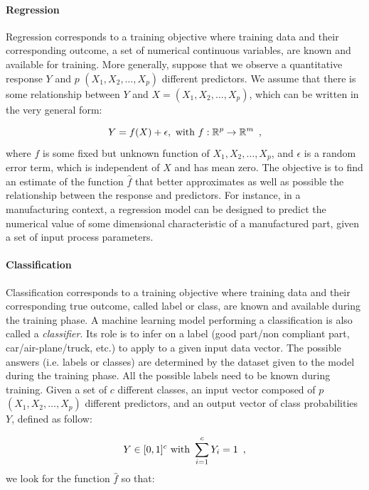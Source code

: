 \paragraph{Regression} \label{Regression}

Regression corresponds to a training objective where training data and their corresponding outcome, a set of numerical continuous variables, are known and available for training. More generally, suppose that we observe a quantitative response $Y$ and $p$ $(X_1,X_2,\ldots,X_p)$ different predictors. We assume that there is some relationship between $Y$ and $X = (X_1,X_2,\ldots,X_p)$, which can be written in the very general form: 

\begin{equation}
  Y=f(X) + \epsilon, \textnormal{ with } f:\mathbb{R}^{p} \rightarrow \mathbb{R}^{m}
  \enspace,
\end{equation}
where $f$ is some fixed but unknown function of $X_1,X_2,\ldots,X_p$, and $\epsilon$ is a random error term, which is independent of $X$ and has mean zero. The objective is to find an estimate of the function $\hat{f}$ that better approximates as well as possible the relationship between the response and predictors. For instance, in a manufacturing context, a regression model can be designed to predict the numerical value of some dimensional characteristic of a manufactured part, given a set of input process parameters.

\paragraph{Classification} \label{Classification}

Classification corresponds to a training objective where training data and their corresponding true outcome, called label or class, are known and available during the training phase. A machine learning model performing a classification is also called a \textit{classifier}. Its role is to infer on a label (good part/non compliant part, car/air-plane/truck, etc.) to apply to a given input data vector. The possible answers (i.e. labels or classes) are determined by the dataset given to the model during the training phase. All the possible labels need to be known during training. Given a set of $c$ different classes, an input vector composed of $p$ $(X_1,X_2,\ldots,X_p)$ different predictors, and an output vector of class probabilities $Y$, defined as follow:

\begin{equation}
    Y \in [0, 1]^{c} \textnormal{ with } \sum_{i=1}^{c} Y_{i} = 1
    \enspace,
\end{equation}
we look for the function $\hat{f}$ so that:

